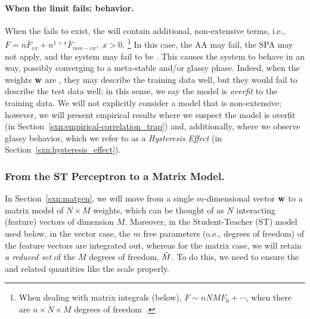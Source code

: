 \paragraph{When the \Thermodynamic limit fails: \ATypical behavior.}
When the \ThermodynamicLimit fails to exist, the \FreeEnergy will contain additional, non-extensive terms, i.e.,
$F = n\bar{F}_{ex} + n^{1+x}\bar{F}_{non-ex},\;x>0$.
\footnote{When dealing with matrix integrals (below), $F\sim nNMF_{0}+\cdots$, when there are $n \times N \times M$ degrees
of freedom~\cite{PP95}.}
In this case, the AA may fail, the SPA may not apply, and the system may fail to be \SelfAveraging.
This causes the system to behave in an \ATypical way, 
possibly converging to a meta-stable and/or glassy phase.
Indeed, when the weights ${\mathbf{w}}$ are \emph{\ATypical}, they may describe the training data well, 
but they would fail to describe the test data well; in this sense, we say the model is \emph{overfit} to the training data.
We will not explicitly consider a model that is non-extensive; however, we will
present empirical results where we suspect the model is overfit
(in Section~\ref{sxn:empirical-correlation_trap})
and, additionally, where we observe glassy behavior, which we refer to as a \emph{Hysteresis Effect}
(in Section~\ref{sxn:hysteresis_effect}).


\subsubsection{From the ST Perceptron to a Matrix Model.} 
\label{sxn:from_vectors}
In Section~\ref{sxn:matgen}, we will move from a single $m$-dimensional \Perceptron vector ${\mathbf{w}}$ 
to a matrix model of $N \times M$ weights, which can be thought of
as $N$ interacting (feature) vectors of dimension $M$.
Moreover, in the Student-Teacher (ST) model used below,
in the vector case, the $m$ free parameters (o.e., degrees of freedom) of the feature vectors are integrated out,
whereas for the matrix case, we will retain \emph{a reduced set} of the $M$ degrees of freedom, $\tilde{M}$. To do this, we need to ensure the \FreeEnergies and related quantities like the \LayerQualitySquared scale properly.

